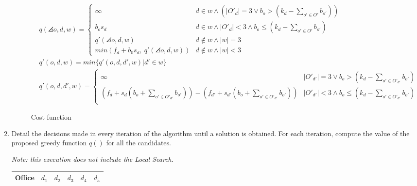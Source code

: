 \documentclass[12pt, a4paper]{article}
\begin{document}
\begin{enumerate}[label=(\alph*)]
    \begin{figure}[H]
      \begin{align*}
        &q(\angles{o, d}, w) =
          \begin{cases}
              \infty & d \in w \land (|O'_{d}| = 3 \lor b_{o} > (k_{d} - \sum_{o' \in O'}b_{o'}))    \\
              b_{o}s_{d} & d \in w \land |O'_{d}| < 3 \land b_{o} \le (k_{d} - \sum_{o' \in O'}b_{o'})    \\
              q'(\angles{o, d}, w) & d \notin w \land |w| = 3 \\
              min (f_{d}+ b_{0}s_{d}, \ q'(\angles{o, d}, w)) & d \notin w \land |w| < 3
          \end{cases}\\
        &q'(o, d, w) = min \{ q'(o, d, d', w) | d' \in w \}\\
        &q'(o, d, d', w) =
          \begin{cases}
            \infty & |O'_{d'}| = 3 \lor b_{o} > (k_{d} - \sum_{o' \in O'_{d'}}b_{o'}) \\
            {\scriptstyle(f_{d}+s_{d}(b_{o} + \sum_{o' \in O'_{d'}}b_{o'})) - (f_{d'}+s_{d'}(b_{o} + \sum_{o' \in O'_{d'}}b_{o'}))} & |O'_{d'}| < 3 \land b_{o} \le (k_{d} - \sum_{o' \in O'_{d'}}b_{o'}) \\
          \end{cases}
      \end{align*}
      \caption{Cost function}
    \end{figure}

  \item Detail the decisions made in every iteration of the algorithm until a solution is obtained. For each iteration, compute the value of the proposed greedy function $q()$ for all the candidates.

  \textit{Note: this execution does not include the Local Search}.

    \begin{table}[H]
    \begin{tabular}{l|lllll}
    Office & \multicolumn{1}{l}{$d_{1}$} & \multicolumn{1}{l}{$d_{2}$} & \multicolumn{1}{l}{$d_{3}$} & \multicolumn{1}{l}{$d_{4}$} & $d_{5}$ \\ \hline


\end{tabular}
\end{table}
\end{enumerate}
\end{document}
